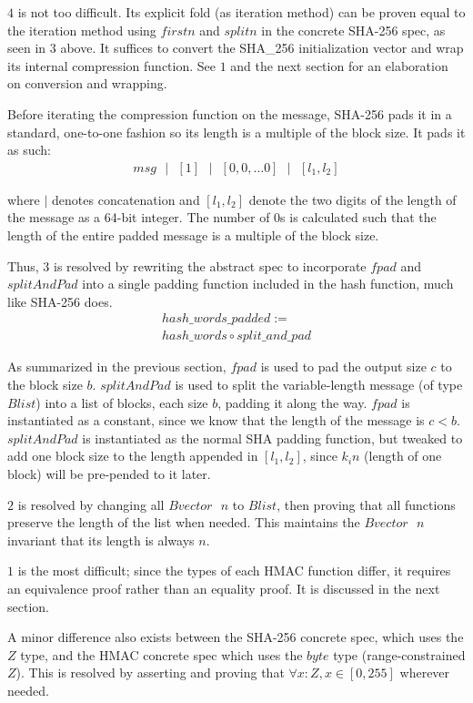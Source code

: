 \documentclass[twocolumn,showpacs,%
  nofootinbib,aps,superscriptaddress,%
  eqsecnum,prd,notitlepage,showkeys,10pt]{revtex4-1}
\newcommand{\eqn}[1] {\begin{gather*}#1\end{gather*}}
\newcommand{\s} {\textrm{ }}
\begin{document}
$4$ is not too difficult. Its explicit fold (as iteration method) can be proven equal to the iteration method using $firstn$ and $splitn$ in the concrete SHA-256 spec, as seen in $3$ above. It suffices to convert the SHA\_256 initialization vector and wrap its internal compression function. See $1$ and the next section for an elaboration on conversion and wrapping.

Before iterating the compression function on the message, SHA-256 pads it in a standard, one-to-one fashion so its length is a multiple of the block size. It pads it as such:
\eqn{msg\s | \s [1] \s | \s [0, 0, \ldots 0] \s | \s [l_1, l_2]}

where $|$ denotes concatenation and $[l_1, l_2]$ denote the two digits of the length of the message as a 64-bit integer. The number of $0$s is calculated such that the length of the entire padded message is a multiple of the block size. 

 Thus, $3$ is resolved by rewriting the abstract spec to incorporate $fpad$ and $splitAndPad$ into a single padding function included in the hash function, much like SHA-256 does.
\eqn{ hash\_words\_padded := \\ hash\_words \circ split\_and\_pad}

As summarized in the previous section, $fpad$ is used to pad the output size $c$ to the block size $b$. $splitAndPad$ is used to split the variable-length message (of type $Blist$) into a list of blocks, each size $b$, padding it along the way. $fpad$ is instantiated as a constant, since we know that the length of the message is $c < b$. $splitAndPad$ is instantiated as the normal SHA padding function, but tweaked to add one block size to the length appended in $[l_1, l_2]$, since $k_in$ (length of one block) will be pre-pended to it later.

$2$ is resolved by changing all $Bvector \s n$ to $Blist$, then proving that all functions preserve the length of the list when needed. This maintains the $Bvector \s n$ invariant that its length is always $n$.

$1$ is the most difficult; since the types of each HMAC function differ, it requires an equivalence proof rather than an equality proof. It is discussed in the next section. 

A minor difference also exists between the SHA-256 concrete spec, which uses the $Z$ type, and the HMAC concrete spec which uses the $byte$ type (range-constrained $Z$). This is resolved by asserting and proving that $\forall x:Z, x \in [0, 255]$ wherever needed.
\end{document}
